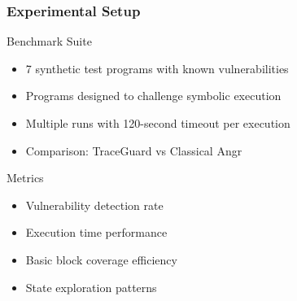 \documentclass[aspectratio=169]{beamer}
\begin{document}
\begin{frame}
    \frametitle{Experimental Setup}
    \begin{implementation}{Benchmark Suite}
        \begin{itemize}
            \item 7 synthetic test programs with known vulnerabilities
            \item Programs designed to challenge symbolic execution
            \item Multiple runs with 120-second timeout per execution
            \item Comparison: TraceGuard vs Classical Angr
        \end{itemize}
    \end{implementation}
    
    \begin{evaluation}{Metrics}
        \begin{itemize}
            \item Vulnerability detection rate
            \item Execution time performance
            \item Basic block coverage efficiency
            \item State exploration patterns
        \end{itemize}
    \end{evaluation}
\end{frame}
\end{document}
